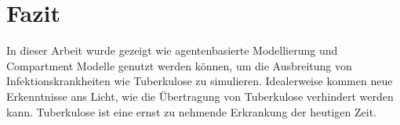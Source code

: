 \documentclass[paper=a4, fontsize=11pt, ngerman, abstract=on]{scrartcl}
\numberwithin{equation}{section} %
\numberwithin{figure}{section} %
\numberwithin{table}{section} %
\begin{document}
\section{Fazit}

In dieser Arbeit wurde gezeigt wie agentenbasierte Modellierung und Compartment Modelle genutzt werden können, um die Ausbreitung von Infektionskrankheiten wie Tuberkulose zu simulieren. Idealerweise kommen neue Erkenntnisse ans Licht, wie die Übertragung von Tuberkulose verhindert werden kann. Tuberkulose ist eine ernst zu nehmende Erkrankung der heutigen Zeit.

\newpage



\end{document}
